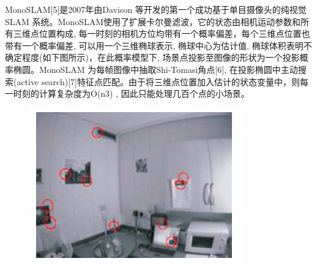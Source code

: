 MonoSLAM[5]是2007年由Davison 等开发的第一个成功基于单目摄像头的纯视觉SLAM 系统。MonoSLAM使用了扩展卡尔曼滤波，它的状态由相机运动参数和所有三维点位置构成, 每一时刻的相机方位均带有一个概率偏差，每个三维点位置也带有一个概率偏差, 可以用一个三维椭球表示, 椭球中心为估计值, 椭球体积表明不确定程度(如下图所示)，在此概率模型下, 场景点投影至图像的形状为一个投影概率椭圆。MonoSLAM 为每帧图像中抽取Shi-Tomasi角点[6], 在投影椭圆中主动搜索(active search)[7]特征点匹配。由于将三维点位置加入估计的状态变量中，则每一时刻的计算复杂度为O(n3) , 因此只能处理几百个点的小场景。
\begin{figure}[H]%
	\centering  %
	\includegraphics[width=0.7\linewidth]{image/Talk/8.png}  %

\end{figure}



